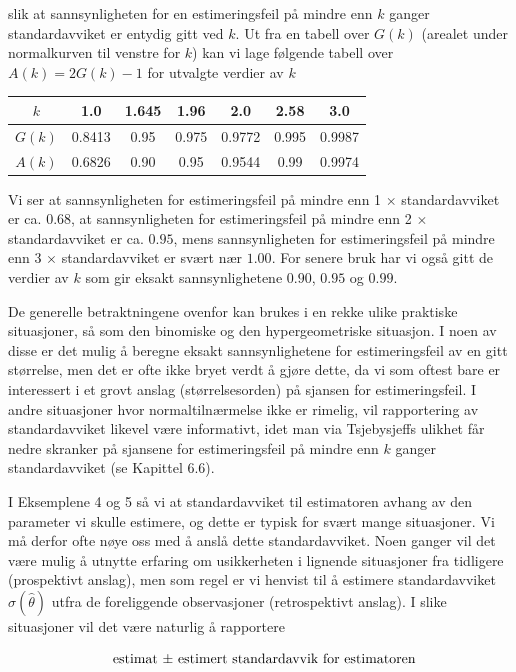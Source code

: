 \noindent slik at sannsynligheten for en estimeringsfeil på mindre enn $k$
ganger standardavviket er entydig gitt ved $k$. Ut fra en tabell
over $G(k)$ (arealet under normalkurven til venstre for $k$) kan
vi lage følgende tabell over $A(k)=2G(k)-1$ for utvalgte verdier av $k$
\begin{center}
\begin{tabular}{c|cccccc}
  $k$  & 1.0  & 1.645  & 1.96  & 2.0   & 2.58   & 3.0  \\ \hline
 $G(k)$&0.8413& 0.95  & 0.975 &0.9772 & 0.995 & 0.9987 \\
 $A(k)$&0.6826& 0.90  & 0.95 &0.9544 & 0.99 & 0.9974 \\ \hline
\end{tabular}
\end{center}
Vi ser at sannsynligheten for estimeringsfeil på mindre enn 1 $\times$
standardavviket er ca. $0.68$, at sannsynligheten for
estimeringsfeil på mindre enn 2 $\times$ standardavviket er ca. $0.95$,
mens sannsynligheten for estimeringsfeil på mindre enn 3 $\times$
standardavviket er svært nær $1.00$. For senere bruk har vi også
gitt de verdier av $k$ som gir eksakt sannsynlighetene $0.90$,
$0.95$ og $0.99$.

De generelle betraktningene ovenfor kan brukes i en rekke ulike
praktiske situasjoner, så som den binomiske og den
hypergeometriske situasjon. I noen av disse er det mulig å
beregne eksakt sannsynlighetene for esti\-me\-ringsfeil av en gitt
størrelse, men det er ofte ikke bryet verdt å gjøre dette, da vi
som oftest bare er interessert i et grovt anslag
(størrelsesorden) på sjansen for estimeringsfeil. I andre
situasjoner hvor normaltilnærmelse ikke er rimelig, vil
rapportering av standardavviket likevel være informativt, idet
man via Tsjebysjeffs ulikhet får nedre skranker på sjansene for
estimeringsfeil på mindre enn $k$ ganger standardavviket (se
Kapittel 6.6).

I Eksemplene 4 og 5 så vi at standardavviket til estimatoren
avhang av den parameter vi skulle estimere, og dette er typisk
for svært mange situasjoner. Vi må derfor ofte nøye oss med å
anslå dette standardavviket. Noen ganger vil det være mulig å
utnytte erfaring om usikkerheten i lignende situasjoner fra
tidligere (prospektivt anslag), men som regel er vi henvist til å
estimere standardavviket $\sigma ( \hat{\theta} )$ utfra de foreliggende
observasjoner (retrospektivt anslag). I slike situasjoner vil det
være naturlig å rapportere 

\[    \mbox{\ \ estimat $ \pm $ estimert standardavvik for estimatoren} \]

